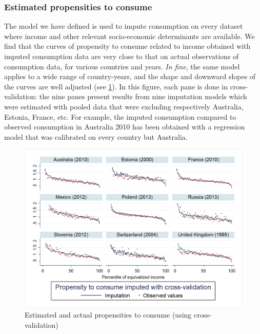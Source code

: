 \documentclass[12pt]{article}
\begin{document}
\subsubsection{Estimated propensities to consume}
 The model we have defined is used to impute consumption on every dataset where income and other relevant socio-economic determinants are available. We find that the curves of propensity to consume related to income obtained with imputed consumption data are very close to that on actual observations of consumption data, for various countries and years. \textit{In fine}, the same model applies to a wide range of country-years, and the shape and downward slopes of the curves are well adjusted (see \cref{fig:estimated_propensities}). In this figure, each pane is done in cross-validation: the nine panes present results from nine imputation models which were estimated with pooled data that were excluding respectively Australia, Estonia, France, etc. For example, the imputed consumption compared to observed consumption in Australia 2010 has been obtained with a regression model that was calibrated on every country but Australia.

\begin{figure}[hp]
\centering
\includegraphics[height=0.42\textheight]{images/18-11-19_cross-validation}
\caption[Coucou]{Estimated and actual propensities to consume (using cross-validation\footnotemark)}
\label{fig:estimated_propensities}  
\end{figure}

\end{document}
